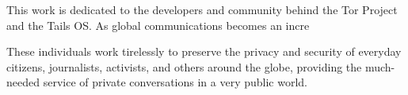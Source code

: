 

\begin{dedication}

This work is dedicated to the developers and community behind the Tor Project and the Tails OS. As global communications becomes an incre


These individuals work tirelessly to preserve the privacy and security of everyday citizens, journalists, activists, and others around the globe, providing the much-needed service of private conversations in a very public world.

\end{dedication}
